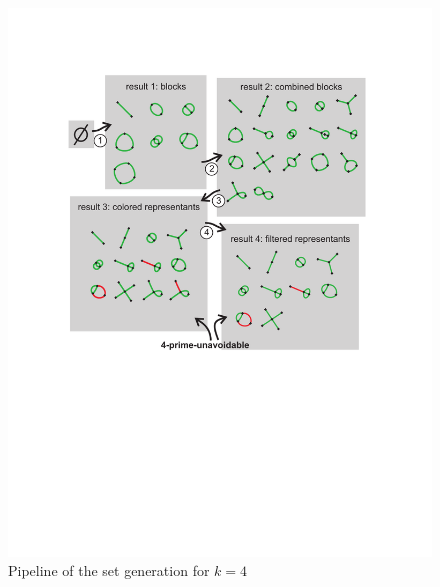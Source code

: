 \begin{figure}[htp]
   \begin{center}
      \leavevmode
      \includegraphics[width=12cm]{fig/unavoidableSetPipeline.pdf}
   \end{center}
   \vspace{-0.7cm}
   \caption{Pipeline of the \kpu set generation for $k=4$}
   \label{fig:unavoidableSetPipeline}
\end{figure}

